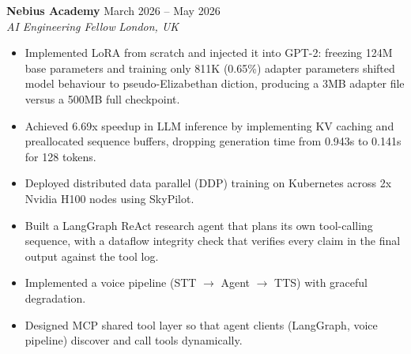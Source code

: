 \documentclass[a4paper,10pt]{article}
\newcommand{\role}[4]{
  \textbf{\color{accent}#1} \hfill {\small #2}\\
  \textit{#3} \hfill {\small \textit{#4}}
}
\begin{document}
\role{Nebius Academy}{March 2026 -- May 2026}{AI Engineering Fellow}{London, UK}
\begin{itemize}

  \item Implemented LoRA from scratch and injected it into GPT-2: freezing 124M base parameters and training only 811K (0.65\%) adapter parameters shifted model behaviour to pseudo-Elizabethan diction, producing a 3MB adapter file versus a 500MB full checkpoint.
  \item Achieved 6.69x speedup in LLM inference by implementing KV caching and preallocated sequence buffers, dropping generation time from 0.943s to 0.141s for 128 tokens.
  \item Deployed distributed data parallel (DDP) training on Kubernetes across 2x Nvidia H100 nodes using SkyPilot.
 \item Built a LangGraph ReAct research agent that plans its own tool-calling sequence, with a dataflow integrity check that verifies every claim in the final output against the tool log.

  \item Implemented a voice pipeline (STT $\rightarrow$ Agent $\rightarrow$ TTS) with graceful degradation.
   \item Designed MCP shared tool layer so that agent clients (LangGraph, voice pipeline) discover and call tools dynamically.
\end{itemize}
\end{document}

